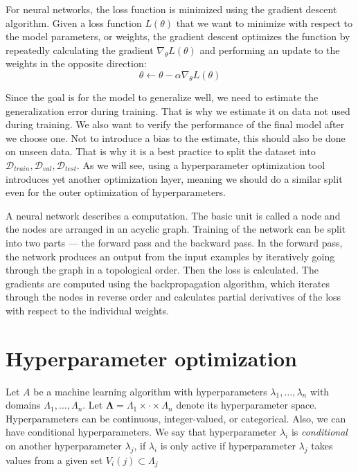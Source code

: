 For neural networks, the loss function is minimized using the gradient descent algorithm. Given a loss function $L(\theta)$ that we want to minimize with respect to the model parameters, or weights, the gradient descent optimizes the function by repeatedly calculating the gradient $\nabla_\theta L(\theta)$ and performing an update to the weights in the opposite direction: $$ \theta \leftarrow \theta - \alpha \nabla_\theta L(\theta)$$

Since the goal is for the model to generalize well, we need to estimate the generalization error during training. That is why we estimate it on data not used during training. We also want to verify the performance of the final model after we choose one. Not to introduce a bias to the estimate, this should also be done on unseen data. That is why it is a best practice to split the dataset into $\mathcal{D}_{train}, \mathcal{D}_{val}, \mathcal{D}_{test}$. As we will see, using a hyperparameter optimization tool introduces yet another optimization layer, meaning we should do a similar split even for the outer optimization of hyperparameters.

A neural network describes a computation. The basic unit is called a node and the nodes are arranged in an acyclic graph. Training of the network can be split into two parts --- the forward pass and the backward pass. In the forward pass, the network produces an output from the input examples by iteratively going through the graph in a topological order. Then the loss is calculated. The gradients are computed using the backpropagation algorithm, which iterates through the nodes in reverse order and calculates partial derivatives of the loss with respect to the individual weights.



\section{Hyperparameter optimization}

Let $A$ be a machine learning algorithm with hyperparameters $\lambda_1, \dots , \lambda_n$ with domains $\Lambda_1,\dots , \Lambda_n$. Let $ \mathbf{\Lambda } = \Lambda_1 \times \cdot \times \Lambda_n$ denote its hyperparameter space. Hyperparameters can be continuous, integer-valued, or categorical. Also, we can have conditional hyperparameters. We say that hyperparameter $\lambda_i$ is \emph{conditional} on another hyperparameter $\lambda_j$, if $\lambda_i$ is only active if hyperparameter $\lambda_j$ takes values from a given set $V_i(j) \subset \Lambda_j$

